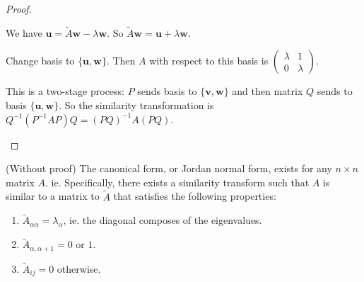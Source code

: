 \documentclass[a4paper]{article}
\begin{document}
\begin{proof}
\begin{enumerate}
            We have $\mathbf{u} = \tilde A\mathbf{w} - \lambda\mathbf{w}$. So $\tilde A\mathbf{w} = \mathbf{u} + \lambda\mathbf{w}$. 

            Change basis to $\{\mathbf{u}, \mathbf{w}\}$. Then $A$ with respect to this basis is $
            \begin{pmatrix}
              \lambda & 1\\
              0 & \lambda
            \end{pmatrix}$.

            This is a two-stage process: $P$ sends basis to $\{\mathbf{v}, \mathbf{w}\}$ and then matrix $Q$ sends to basis $\{\mathbf{u}, \mathbf{w}\}$. So the similarity transformation is $Q^{-1}(P^{-1}AP)Q = (PQ)^{-1}A(PQ)$.
        \end{enumerate}
      \end{proof}

      \begin{prop}
        (Without proof) The canonical form, or Jordan normal form, exists for any $n\times n$ matrix $A$. ie. Specifically, there exists a similarity transform such that $A$ is similar to a matrix to $\tilde{A}$ that satisfies the following properties:
        \begin{enumerate}
          \item $\tilde{A}_{\alpha\alpha} = \lambda_\alpha$, ie. the diagonal composes of the eigenvalues.
          \item $\tilde{A}_{\alpha, \alpha + 1} = 0$ or $1$.
          \item $\tilde{A}_{ij} = 0$ otherwise.
        \end{enumerate}
      \end{prop}
\end{document}
